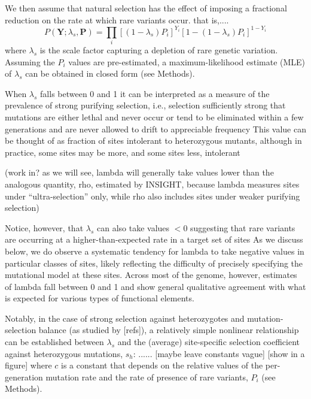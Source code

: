 \documentclass[11pt]{article}
\newcommand{\mathbb}[1]{\boldsymbol{\mathbf{#1}}}
\begin{document}
We then assume that natural selection has the effect of imposing a fractional reduction on the rate at which rare variants occur.  that is,....
\begin{equation}
  P(\mathbb{Y}; \lambda_s, \mathbb{P}) = \prod_i \left[(1-\lambda_s) P_i\right]^{Y_i}\left[1- (1-\lambda_s) P_i\right]^{1-Y_i}
\end{equation}
\noindent where $\lambda_s$ is the scale factor capturing a depletion of rare genetic variation.  Assuming the $P_i$ values are pre-estimated, a maximum-likelihood estimate (MLE) of $\lambda_s$ can be obtained in closed form (see Methods).

When $\lambda_s$ falls between 0 and 1 it can be interpreted as a measure of the prevalence of strong purifying selection,
i.e., selection sufficiently strong that mutations are either lethal and never occur or tend to be eliminated within a few generations and are never allowed to drift to appreciable frequency
This value can be thought of as fraction of sites intolerant to heterozygous mutants, although in practice, some sites may be more, and some sites less, intolerant

(work in?  as we will see, lambda will generally take values lower than the analogous quantity, rho, estimated by INSIGHT, because lambda measures sites under ``ultra-selection'' only, while rho also includes sites under weaker purifying selection)

Notice, however, that $\lambda_s$ can also take values $<0$
suggesting that rare variants are occurring at a higher-than-expected rate in a target set of sites
As we discuss below, we do observe a systematic tendency for lambda to take negative values in particular classes of sites, likely reflecting the difficulty of precisely specifying the mutational model at these sites.
Across most of the genome, however, estimates of lambda fall between 0 and 1 and show general qualitative agreement with what is expected for various types of functional elements.

Notably, in the case of strong selection against heterozygotes and mutation-selection balance (as studied by [refs]),
a relatively simple nonlinear relationship can be established between $\lambda_s$ and the (average) site-specific selection coefficient against heterozygous mutations, $s_h$:    ......     [maybe leave constants vague]     [show in a figure]
where $c$ is a constant that depends on the relative values of the per-generation mutation rate and the rate of presence of rare variants, $P_i$ (see Methods).
\end{document}
